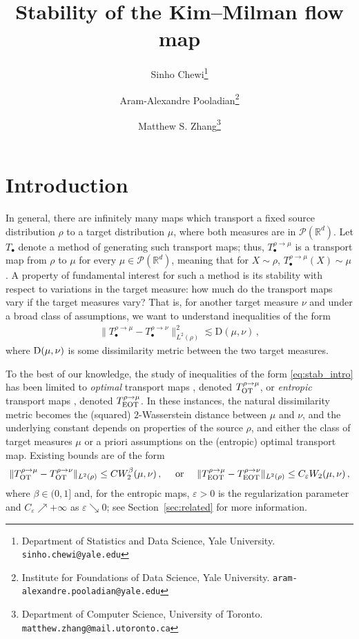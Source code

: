 \documentclass[12pt]{article}
\title{Stability of the Kim--Milman flow map}
\author{
Sinho Chewi\thanks{Department of Statistics and Data Science, Yale University. \tt{sinho.chewi@yale.edu}} \and 
Aram-Alexandre Pooladian\thanks{Institute for Foundations of Data Science, Yale University. \tt aram-alexandre.pooladian@yale.edu}\and
Matthew S. Zhang\thanks{Department of Computer Science, University of Toronto. \tt matthew.zhang@mail.utoronto.ca} 
}
\newcommand{\cP}{\mathcal{P}}
\newcommand{\RR}{\mathbb{R}}
\newcommand{\R}{\RR}
\newcommand{\1}{\mathds{1}}
\newcommand{\eps}{\varepsilon}
\theoremstyle{plain}
\theoremstyle{definition}
\theoremstyle{remark}
\begin{document}
\maketitle
{}

\section{Introduction}\label{sec:intro}
In general, there are infinitely many maps which transport a fixed source distribution $\rho$ to a target distribution $\mu$, {where both measures are} in $\cP(\R^d)$. Let $T_\bullet$ denote a method of generating such transport maps; thus, $T_{\bullet}^{\rho\to\mu}$ is a transport map from $\rho$ to $\mu$ for every $\mu \in \cP(\R^d)$, meaning that for $X\sim\rho$, $T_\bullet^{\rho\to\mu}(X)\sim\mu$. A property of fundamental interest for such a method is its stability with respect to variations in the target measure: how much do the transport maps vary if the target measures vary? That is, for another target measure $\nu$ and under a broad class of assumptions, we want to understand inequalities of the form 
\begin{align}\label{eq:stab_intro}
\|T^{\rho\to\mu}_\bullet - T_\bullet^{\rho\to\nu}\|^2_{L^2(\rho)} \lesssim \mathrm{D}(\mu,\nu)\,,
\end{align}
where $\rm{D}(\mu,\nu)$ is some dissimilarity metric between the two target measures.

To the best of our knowledge, the study of inequalities of the form \eqref{eq:stab_intro} has been limited to \emph{optimal} transport maps \cite{gigli2011holder, kitagawa2025stability,
letrouit2024gluing,
balakrishnan2025stability}, denoted $T_{\rm OT}^{\rho\to\mu}$, or \emph{entropic} transport maps \cite{carlier2024displacement,
divol2025tight}, denoted $T_{\rm EOT}^{\rho\to\mu}$. In these instances, the natural dissimilarity metric becomes the (squared) $2$-Wasserstein distance between $\mu$ and $\nu$, and the underlying constant depends on properties of the source $\rho$, and either the class of target measures $\mu$ or a priori assumptions on the (entropic) optimal transport map.
Existing bounds are of the form
\begin{align*}
\|T^{\rho\to\mu}_{\rm OT} - T_{\rm OT}^{\rho\to\nu}\|_{L^2(\rho)} \leq C W_2^{{\beta}}(\mu,\nu)\,, \quad \text{ or } \quad \|T^{\rho\to\mu}_{\rm EOT} - T_{\rm EOT}^{\rho\to\nu}\|_{L^2(\rho)} \leq C_\eps W_2(\mu,\nu)\,,
\end{align*}
where {$\beta \in (0,1]$ and}, for the entropic maps, $\eps > 0$ is the regularization parameter and  $C_\eps \nearrow +\infty$ as $\eps \searrow 0$; see Section~\ref{sec:related} for more information. 
\end{document}
